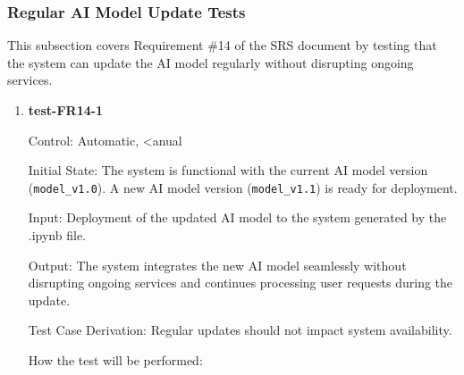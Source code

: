 \documentclass[12pt, titlepage]{article}
\begin{document}
\subsubsection{Regular AI Model Update Tests}

This subsection covers Requirement \#14 of the SRS document by testing that the system can update the AI model regularly without disrupting ongoing services.

\begin{enumerate}

\item \textbf{test-FR14-1} \label{test-FR14-1}

Control: Automatic, <anual

Initial State: The system is functional with the current AI model version (\texttt{model\_v1.0}). A new AI model version (\texttt{model\_v1.1}) is ready for deployment.

Input: Deployment of the updated AI model to the system generated by the .ipynb file.

Output: The system integrates the new AI model seamlessly without disrupting ongoing services and continues processing user requests during the update.

Test Case Derivation: Regular updates should not impact system availability.

How the test will be performed:


\end{enumerate}
\end{document}
